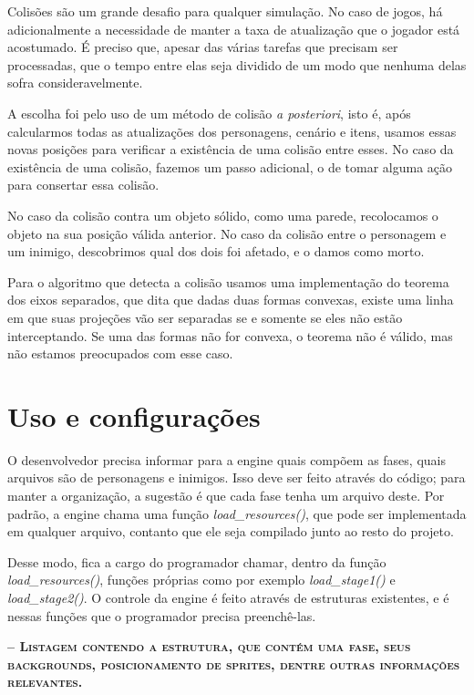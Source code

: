 \documentclass[brazil]{abnt}
\begin{document}
Colisões são um grande desafio para qualquer simulação. No caso de jogos, há adicionalmente a necessidade de manter a taxa de atualização que o jogador está acostumado. É preciso que, apesar das várias tarefas que precisam ser processadas, que o tempo entre elas seja dividido de um modo que nenhuma delas sofra consideravelmente.

A escolha foi pelo uso de um método de colisão \textit{a posteriori}, isto é, após calcularmos todas as atualizações dos personagens, cenário e itens, usamos essas novas posições para verificar a existência de uma colisão entre esses. No caso da existência de uma colisão, fazemos um passo adicional, o de tomar alguma ação para consertar essa colisão.

No caso da colisão contra um objeto sólido, como uma parede, recolocamos o objeto na sua posição válida anterior. No caso da colisão entre o personagem e um inimigo, descobrimos qual dos dois foi afetado, e o damos como morto.

Para o algoritmo que detecta a colisão usamos uma implementação do teorema dos eixos separados, que dita que dadas duas formas convexas, existe uma linha em que suas projeções vão ser separadas se e somente se eles não estão interceptando. Se uma das formas não for convexa, o teorema não é válido, mas não estamos preocupados com esse caso.

\section{Uso e configurações}

O desenvolvedor precisa informar para a engine quais compõem as fases, quais arquivos são de personagens e inimigos. Isso deve ser feito através do código; para manter a organização, a sugestão é que cada fase tenha um arquivo deste. Por padrão, a engine chama uma função \textit{load\_resources()}, que pode ser implementada em qualquer arquivo, contanto que ele seja compilado junto ao resto do projeto.

Desse modo, fica a cargo do programador chamar, dentro da função \textit{load\_resources()}, funções próprias como por exemplo \textit{load\_stage1()} e \textit{load\_stage2()}. O controle da engine é feito através de estruturas existentes, e é nessas funções que o programador precisa preenchê-las.

\textsc{\textbf{-- Listagem contendo a estrutura, que contém uma fase, seus backgrounds, posicionamento de sprites, dentre outras informações relevantes.}}
\end{document}
